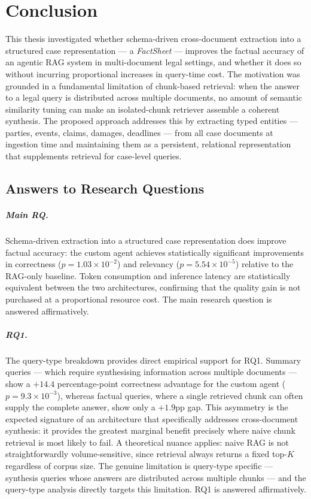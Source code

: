 \chapter{Conclusion}

This thesis investigated whether schema-driven cross-document extraction into a
structured case representation --- a \textit{FactSheet} --- improves the factual accuracy
of an agentic RAG system in multi-document legal settings, and whether it does so without
incurring proportional increases in query-time cost. The motivation was grounded in a
fundamental limitation of chunk-based retrieval: when the answer to a legal query is
distributed across multiple documents, no amount of semantic similarity tuning can make
an isolated-chunk retriever assemble a coherent synthesis. The proposed approach addresses
this by extracting typed entities --- parties, events, claims, damages, deadlines --- from
all case documents at ingestion time and maintaining them as a persistent, relational
representation that supplements retrieval for case-level queries.

\section{Answers to Research Questions}

\paragraph{Main RQ.}
Schema-driven extraction into a structured case representation does improve factual
accuracy: the custom agent achieves statistically significant improvements in correctness
($p = 1.03 \times 10^{-2}$) and relevancy ($p = 5.54 \times 10^{-5}$) relative to the
RAG-only baseline. Token consumption and inference latency are statistically equivalent
between the two architectures, confirming that the quality gain is not purchased at a
proportional resource cost. The main research question is answered affirmatively.

\paragraph{RQ1.}
The query-type breakdown provides direct empirical support for RQ1. Summary queries ---
which require synthesising information across multiple documents --- show a $+14.4$
percentage-point correctness advantage for the custom agent ($p = 9.3 \times 10^{-3}$),
whereas factual queries, where a single retrieved chunk can often supply the complete
answer, show only a $+1.9$pp gap. This asymmetry is the expected signature of an
architecture that specifically addresses cross-document synthesis: it provides the greatest
marginal benefit precisely where naive chunk retrieval is most likely to fail. A theoretical
nuance applies: naive RAG is not straightforwardly volume-sensitive, since retrieval always
returns a fixed top-$K$ regardless of corpus size. The genuine limitation is
query-type specific --- synthesis queries whose answers are distributed across multiple
chunks --- and the query-type analysis directly targets this limitation. RQ1 is answered
affirmatively.

